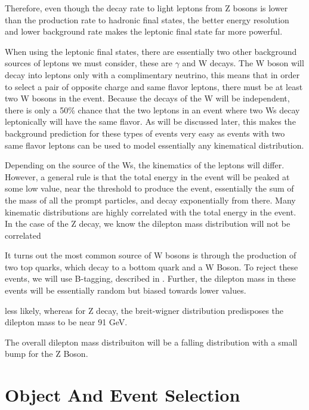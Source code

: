 Therefore, even though the decay rate to light leptons from Z bosons is lower than the production rate to hadronic final states, the better energy resolution and lower background rate makes the leptonic final state far more powerful.

When using the leptonic final states, there are essentially two other background sources of leptons we must consider, these are $\gamma$ and W decays. The W boson will decay into leptons only with a complimentary neutrino, this means that in order to select a pair of opposite charge and same flavor leptons, there must be at least two W bosons in the event. Because the decays of the W will be independent, there is only a 50\% chance that the two leptons in an event where two Ws decay leptonically will have the same flavor. As will be discussed later, this makes the background prediction for these types of events very easy as events with two same flavor leptons can be used to model essentially any kinematical distribution.

Depending on the source of the Ws, the kinematics of the leptons will differ. However, a general rule is that the total energy in the event will be peaked at some low value, near the threshold to produce the event, essentially the sum of the mass of all the prompt particles, and decay exponentially from there. Many kinematic distributions are highly correlated with the total energy in the event. In the case of the Z decay, we know the dilepton mass distribution will not be correlated

It turns out the most common source of W bosons is through the production of two top quarks, which decay to a bottom quark and a W Boson. To reject these events, we will use B-tagging, described in . Further, the dilepton mass in these events will be essentially random  but biased towards lower values. 

less likely, whereas for Z decay, the breit-wigner distribution predisposes the dilepton mass to be near 91 GeV. 

The overall dilepton mass distribuiton will be a falling distribution with a small bump for the Z Boson. 

\subsubsection{}

\section{Object And Event Selection}
  

